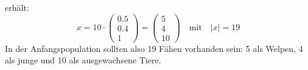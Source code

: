 \begin{exercise}
\begin{enumerate}[a)]
            erhält:
            \begin{equation*}
              x=10\cdot\begin{pmatrix}\num{0.5}\\\num{0.4}\\\num{1}\end{pmatrix}
               =\begin{pmatrix}5\\4\\10\end{pmatrix}
              \quad\text{mit}\quad
              |x|=\num{19}
            \end{equation*}
            In der Anfangspopulation sollten also
            \num{19} Fähen vorhanden sein: \num{5}
            als Welpen, \num{4} als junge und
            \num{10} als ausgewachsene Tiere.
    \end{enumerate}
  \fi
\end{exercise}
